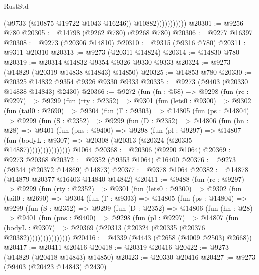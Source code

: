 \begin{lexlean}{RustStd}
\begin{coremodule}
                          (@9733 (@10875 @19722 @1043 @16246))
                          @10882)))))))))))
@20301 := @9256 @780
@20305 := @14798 (@9262 @780) (@9268 @780)
@20306 := @9277 @16397
@20308 := @9273 (@20306 @14810)
@20310 := @9315 (@9316 @780)
@20311 := @9311 @20310
@20313 := @9273 (@20311 @14824)
@20314 := @14830 @780
@20319 := @20314 @14832 @9354 @9326 @9330 @9333
@20324 := @9273 (@14829 (@20319 @14838 @14843) @14850)
@20325 := @14853 @780
@20330 := @20325 @14832 @9354 @9326 @9330 @9333
@20335 := @9273 (@9403 (@20330 @14838 @14843) @2430)
@20366 := @9272
    (fun (fn : @58) =>
    @9298
      (fun (rc : @9297) =>
      @9299
        (fun (rty : @2352) =>
        @9301
          (fun (lets0 : @9300) =>
          @9302
            (fun (tail0 : @2690) =>
            @9304
              (fun (Γ : @9303) =>
              @14805
                (fun (ps : @14804) =>
                @9299
                  (fun (S : @2352) =>
                  @9299
                    (fun (D : @2352) =>
                    @14806
                      (fun (hn : @28) =>
                      @9401
                        (fun (pns : @9400) =>
                        @9298
                          (fun (pl : @9297) =>
                          @14807
                            (fun (bodyL : @9307) =>
                            @20308 (@20313 (@20324 (@20335 @14887))))))))))))))))
    @1064
@20368 := @20306 (@9290 @1064)
@20369 := @9273 @20368
@20372 := @9352 (@9353 @1064) @16400
@20376 := @9273 (@9344 (@20372 @14869) @14873)
@20377 := @9378 @1064
@20382 := @14878 (@14879 @20377 @16403 @14840 @14842)
@20411 := @9488
    (fun (rc : @9297) =>
    @9299
      (fun (rty : @2352) =>
      @9301
        (fun (lets0 : @9300) =>
        @9302
          (fun (tail0 : @2690) =>
          @9304
            (fun (Γ : @9303) =>
            @14805
              (fun (ps : @14804) =>
              @9299
                (fun (S : @2352) =>
                @9299
                  (fun (D : @2352) =>
                  @14806
                    (fun (hn : @28) =>
                    @9401
                      (fun (pns : @9400) =>
                      @9298
                        (fun (pl : @9297) =>
                        @14807
                          (fun (bodyL : @9307) =>
                          @20369 (@20313 (@20324 (@20335 (@20376 @20382))))))))))))))))
@20416 := @4339 (@4443 (@2658 (@4009 @2503) @2668))
@20417 := @20411 @20416
@20418 := @20319 @20416
@20422 := @9273 (@14829 (@20418 @14843) @14850)
@20423 := @20330 @20416
@20427 := @9273 (@9403 (@20423 @14843) @2430)

\end{coremodule}
\end{lexlean}
